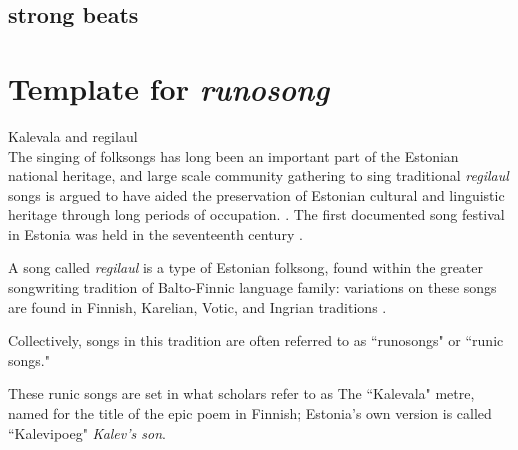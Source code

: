 \subsection{strong beats}

\section{Template for {\it runosong}} 
Kalevala and regilaul 
\cite{sarv1998language}\\
The singing of folksongs has long been an important part of the Estonian national heritage, and large scale community gathering to sing traditional {\it regilaul} songs is argued to have aided the preservation of Estonian cultural and linguistic heritage through long periods of occupation. \citep{bruggemannSingingOneselfNation2014}. The first documented song festival in Estonia was held in the seventeenth century \citep{ruutelTRADITIONALMUSICESTONIA2004}.


A song called {\it regilaul} is a type of Estonian folksong, found within the greater songwriting tradition of Balto-Finnic language family: variations on these songs are found in Finnish, Karelian, Votic, and Ingrian traditions \citep{tormisKalevalaEstonianPerspective1985}. 

Collectively, songs in this tradition are often referred to as ``runosongs" or ``runic songs." 

These runic songs are set in what scholars refer to as The ``Kalevala" metre, named for the title of the epic poem in Finnish; Estonia's own version is called ``Kalevipoeg" {\it Kalev's son}. 

%

